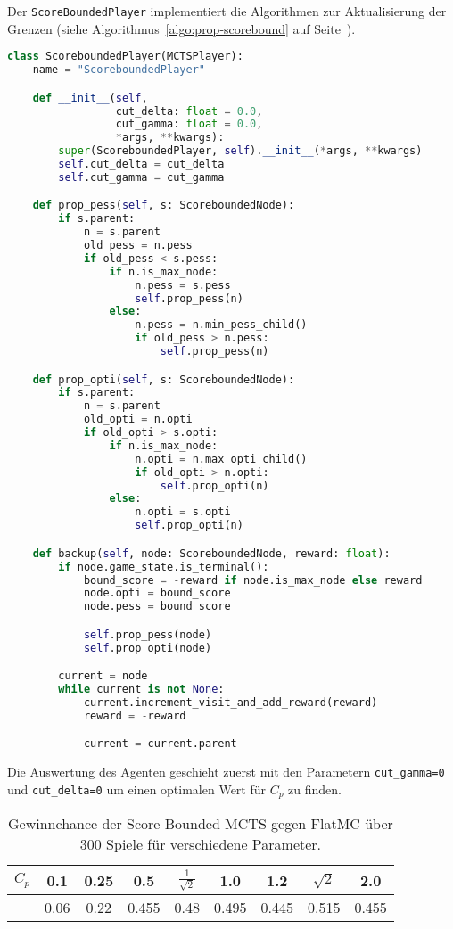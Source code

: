 Der \verb|ScoreBoundedPlayer| implementiert die Algorithmen zur Aktualisierung der Grenzen (siehe Algorithmus~\ref{algo:prop-scorebound} auf Seite~\pageref{algo:prop-scorebound}).

\begin{lstlisting}[language=Python,label={lst:scorebounded-player}]
class ScoreboundedPlayer(MCTSPlayer):
    name = "ScoreboundedPlayer"

    def __init__(self,
                 cut_delta: float = 0.0,
                 cut_gamma: float = 0.0,
                 *args, **kwargs):
        super(ScoreboundedPlayer, self).__init__(*args, **kwargs)
        self.cut_delta = cut_delta
        self.cut_gamma = cut_gamma

    def prop_pess(self, s: ScoreboundedNode):
        if s.parent:
            n = s.parent
            old_pess = n.pess
            if old_pess < s.pess:
                if n.is_max_node:
                    n.pess = s.pess
                    self.prop_pess(n)
                else:
                    n.pess = n.min_pess_child()
                    if old_pess > n.pess:
                        self.prop_pess(n)

    def prop_opti(self, s: ScoreboundedNode):
        if s.parent:
            n = s.parent
            old_opti = n.opti
            if old_opti > s.opti:
                if n.is_max_node:
                    n.opti = n.max_opti_child()
                    if old_opti > n.opti:
                        self.prop_opti(n)
                else:
                    n.opti = s.opti
                    self.prop_opti(n)

    def backup(self, node: ScoreboundedNode, reward: float):
        if node.game_state.is_terminal():
            bound_score = -reward if node.is_max_node else reward
            node.opti = bound_score
            node.pess = bound_score

            self.prop_pess(node)
            self.prop_opti(node)

        current = node
        while current is not None:
            current.increment_visit_and_add_reward(reward)
            reward = -reward

            current = current.parent
\end{lstlisting}

Die Auswertung des Agenten geschieht zuerst mit den Parametern \verb|cut_gamma=0| und \verb|cut_delta=0| um einen optimalen Wert für $C_p$ zu finden.

\begin{table}[h!]
\centering
\begin{tabular}{ |c||c|c|c|c|c|c|c|c| }
 \hline
 $C_p$ & 0.1 & 0.25 & 0.5 & $\frac{1}{\sqrt{2}}$ & 1.0 & 1.2 & $\sqrt{2}$ & 2.0 \\
 \hline
  & 0.06 & 0.22 & 0.455 & 0.48 & 0.495 & 0.445 & 0.515 & 0.455 \\
 \hline
\end{tabular}
\caption{Gewinnchance der Score Bounded MCTS gegen FlatMC über 300 Spiele für verschiedene Parameter.}
\label{tab:scorebound-flat-mc}
\end{table}

